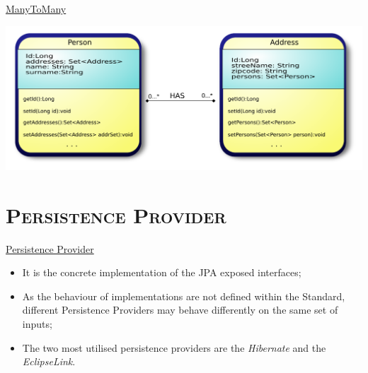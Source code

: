 \documentclass[xcolor=x11names,compress]{beamer}
\renewcommand{\(}{\begin{columns}}
\renewcommand{\)}{\end{columns}}
\newcommand{\<}[1]{\begin{column}{#1}}
\renewcommand{\>}{\end{column}}
\begin{document}
\begin{frame}{\underline{ManyToMany}}
\justifying

\begin{center}

\includegraphics[keepaspectratio, width=\textwidth]{manyToMany}

\end{center}

\end{frame}

\section{\scshape Persistence Provider}
\begin{frame}{\underline{Persistence Provider}}
\begin{itemize}
\itemsep 12pt
\justifying

\item It is the concrete implementation of the JPA exposed interfaces;

\item As the behaviour of implementations are not defined within the Standard, different Persistence Providers may behave differently on the same set of inputs;

\item The two most utilised persistence providers are the \textit{Hibernate} and the \textit{EclipseLink}.
\end{itemize}
\end{frame}

\end{document}
